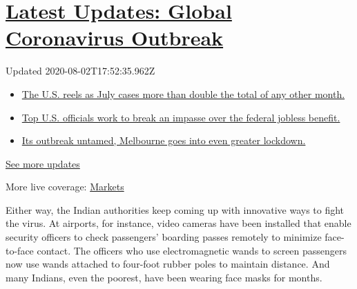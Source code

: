 \hypertarget{latest-updates-global-coronavirus-outbreak}{%
\section{\texorpdfstring{\href{https://www.nytimes.com/2020/08/01/world/coronavirus-covid-19.html?action=click\&pgtype=Article\&state=default\&region=MAIN_CONTENT_1\&context=storylines_live_updates}{Latest
Updates: Global Coronavirus
Outbreak}}{Latest Updates: Global Coronavirus Outbreak}}\label{latest-updates-global-coronavirus-outbreak}}

Updated 2020-08-02T17:52:35.962Z

\begin{itemize}
\tightlist
\item
  \href{https://www.nytimes.com/2020/08/01/world/coronavirus-covid-19.html?action=click\&pgtype=Article\&state=default\&region=MAIN_CONTENT_1\&context=storylines_live_updates\#link-34047410}{The
  U.S. reels as July cases more than double the total of any other
  month.}
\item
  \href{https://www.nytimes.com/2020/08/01/world/coronavirus-covid-19.html?action=click\&pgtype=Article\&state=default\&region=MAIN_CONTENT_1\&context=storylines_live_updates\#link-780ec966}{Top
  U.S. officials work to break an impasse over the federal jobless
  benefit.}
\item
  \href{https://www.nytimes.com/2020/08/01/world/coronavirus-covid-19.html?action=click\&pgtype=Article\&state=default\&region=MAIN_CONTENT_1\&context=storylines_live_updates\#link-2bc8948}{Its
  outbreak untamed, Melbourne goes into even greater lockdown.}
\end{itemize}

\href{https://www.nytimes.com/2020/08/01/world/coronavirus-covid-19.html?action=click\&pgtype=Article\&state=default\&region=MAIN_CONTENT_1\&context=storylines_live_updates}{See
more updates}

More live coverage:
\href{https://www.nytimes.com/live/2020/07/31/business/stock-market-today-coronavirus?action=click\&pgtype=Article\&state=default\&region=MAIN_CONTENT_1\&context=storylines_live_updates}{Markets}

Either way, the Indian authorities keep coming up with innovative ways
to fight the virus. At airports, for instance, video cameras have been
installed that enable security officers to check passengers' boarding
passes remotely to minimize face-to-face contact. The officers who use
electromagnetic wands to screen passengers now use wands attached to
four-foot rubber poles to maintain distance. And many Indians, even the
poorest, have been wearing face masks for months.

